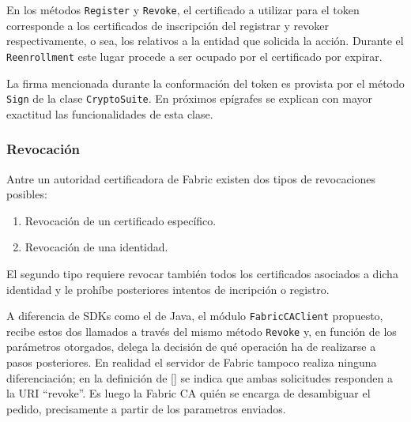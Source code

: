 En los m\'etodos \texttt{Register} y \texttt{Revoke}, el certificado a utilizar para el token corresponde a los certificados de inscripci\'on del registrar y revoker respectivamente, o sea, los relativos a la entidad que solicida la acci\'on. Durante el \texttt{Reenrollment} este lugar procede a ser ocupado por el certificado por expirar.

La firma mencionada durante la conformaci\'on del token es provista por el m\'etodo \texttt{Sign} de la clase \texttt{CryptoSuite}. En pr\'oximos ep\'igrafes se explican con mayor exactitud las funcionalidades de esta clase.



\subsubsection{Revocaci\'on}

Antre un autoridad certificadora de Fabric existen dos tipos de revocaciones posibles: 

\begin{enumerate}
	\item Revocaci\'on de un certificado espec\'ifico.
	\item Revocaci\'on de una identidad.
\end{enumerate}

El segundo tipo requiere revocar tambi\'en todos los certificados asociados a dicha identidad y le proh\'ibe posteriores intentos de incripci\'on o registro.%

A diferencia de SDKs como el de Java, el m\'odulo \texttt{FabricCAClient} propuesto, recibe estos dos llamados a trav\'es del mismo m\'etodo \texttt{Revoke} y, en funci\'on de los par\'ametros otorgados, delega la decisi\'on de qu\'e operaci\'on ha de realizarse a pasos posteriores. En realidad el servidor de Fabric tampoco realiza ninguna diferenciaci\'on; en la definici\'on de [\cite{hlfcaswagger}] se indica que ambas solicitudes responden a la URI “revoke”. Es luego la Fabric CA qui\'en se encarga de desambiguar el pedido, precisamente a partir de los parametros enviados.%

